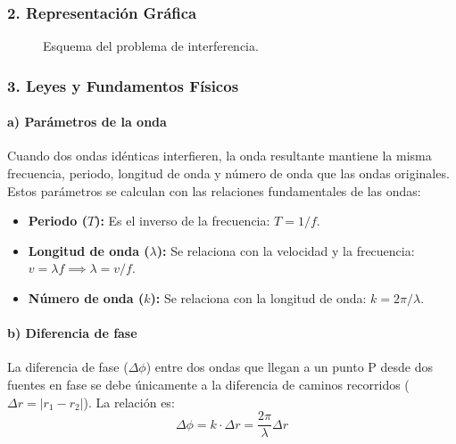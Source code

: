 \subsubsection*{2. Representación Gráfica}
\begin{figure}[H]
    \centering
    \caption{Esquema del problema de interferencia.}
\end{figure}

\subsubsection*{3. Leyes y Fundamentos Físicos}
\paragraph*{a) Parámetros de la onda}
Cuando dos ondas idénticas interfieren, la onda resultante mantiene la misma frecuencia, periodo, longitud de onda y número de onda que las ondas originales. Estos parámetros se calculan con las relaciones fundamentales de las ondas:
\begin{itemize}
    \item \textbf{Periodo ($T$):} Es el inverso de la frecuencia: $T=1/f$.
    \item \textbf{Longitud de onda ($\lambda$):} Se relaciona con la velocidad y la frecuencia: $v = \lambda f \implies \lambda = v/f$.
    \item \textbf{Número de onda ($k$):} Se relaciona con la longitud de onda: $k = 2\pi/\lambda$.
\end{itemize}
\paragraph*{b) Diferencia de fase}
La diferencia de fase ($\Delta\phi$) entre dos ondas que llegan a un punto P desde dos fuentes en fase se debe únicamente a la diferencia de caminos recorridos ($\Delta r = |r_1 - r_2|$). La relación es:
$$ \Delta\phi = k \cdot \Delta r = \frac{2\pi}{\lambda} \Delta r $$

